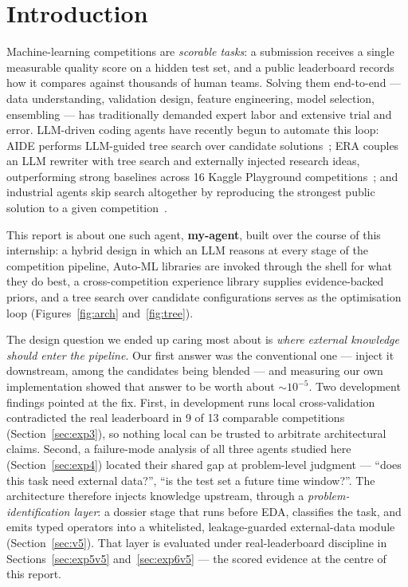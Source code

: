 \documentclass[11pt,a4paper]{article}
\begin{document}
\vspace{0.5em}

\section{Introduction}

Machine-learning competitions are \emph{scorable tasks}: a submission receives a single measurable quality score on a hidden test set, and a public leaderboard records how it compares against thousands of human teams. Solving them end-to-end --- data understanding, validation design, feature engineering, model selection, ensembling --- has traditionally demanded expert labor and extensive trial and error. LLM-driven coding agents have recently begun to automate this loop: AIDE performs LLM-guided tree search over candidate solutions~\cite{aide2025}; ERA couples an LLM rewriter with tree search and externally injected research ideas, outperforming strong baselines across 16 Kaggle Playground competitions~\cite{aygun2026}; and industrial agents skip search altogether by reproducing the strongest public solution to a given competition~\cite{nvidia2026}.

This report is about one such agent, \textbf{my-agent}, built over the course of this internship: a hybrid design in which an LLM reasons at every stage of the competition pipeline, Auto-ML libraries are invoked through the shell for what they do best, a cross-competition experience library supplies evidence-backed priors, and a tree search over candidate configurations serves as the optimisation loop (Figures~\ref{fig:arch} and~\ref{fig:tree}).

The design question we ended up caring most about is \emph{where external knowledge should enter the pipeline}. Our first answer was the conventional one --- inject it downstream, among the candidates being blended --- and measuring our own implementation showed that answer to be worth about ${\sim}10^{-5}$. Two development findings pointed at the fix. First, in development runs local cross-validation contradicted the real leaderboard in 9 of 13 comparable competitions (Section~\ref{sec:exp3}), so nothing local can be trusted to arbitrate architectural claims. Second, a failure-mode analysis of all three agents studied here (Section~\ref{sec:exp4}) located their shared gap at problem-level judgment --- ``does this task need external data?'', ``is the test set a future time window?''. The architecture therefore injects knowledge upstream, through a \emph{problem-identification layer}: a dossier stage that runs before EDA, classifies the task, and emits typed operators into a whitelisted, leakage-guarded external-data module (Section~\ref{sec:v5}). That layer is evaluated under real-leaderboard discipline in Sections~\ref{sec:exp5v5} and~\ref{sec:exp6v5} --- the scored evidence at the centre of this report.
\end{document}
